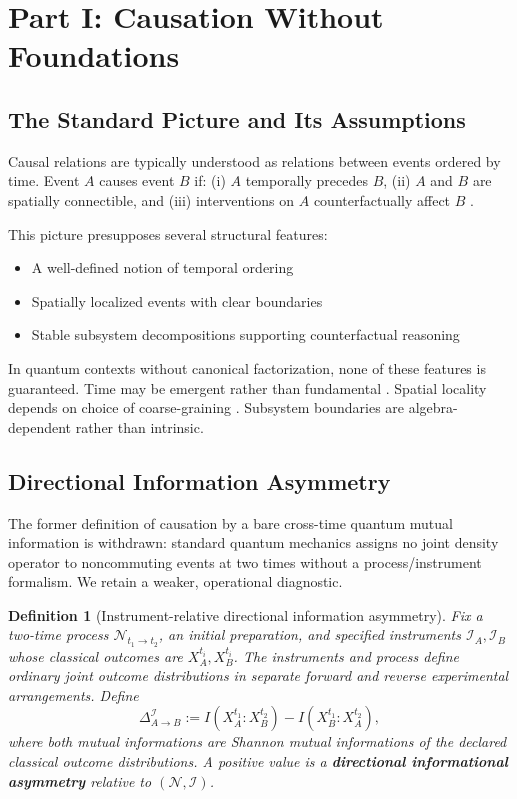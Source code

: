 \documentclass[11pt,a4paper]{article}
\newtheorem{definition}{Definition}[section]
\begin{document}
\section{Part I: Causation Without Foundations}
\label{sec:causation}

\subsection{The Standard Picture and Its Assumptions}
\label{sec:I.1}

Causal relations are typically understood as relations between events ordered by time. Event $A$ causes event $B$ if: (i) $A$ temporally precedes $B$, (ii) $A$ and $B$ are spatially connectible, and (iii) interventions on $A$ counterfactually affect $B$ \cite{Pearl2009}.

This picture presupposes several structural features:
\begin{itemize}
\item A well-defined notion of temporal ordering
\item Spatially localized events with clear boundaries
\item Stable subsystem decompositions supporting counterfactual reasoning
\end{itemize}

In quantum contexts without canonical factorization, none of these features is guaranteed. Time may be emergent rather than fundamental \cite{PageWootters1983}. Spatial locality depends on choice of coarse-graining \cite{Liu2026PaperA}. Subsystem boundaries are algebra-dependent rather than intrinsic.

\subsection{Directional Information Asymmetry}
\label{sec:I.2}

The former definition of causation by a bare cross-time quantum mutual information is withdrawn: standard quantum mechanics assigns no joint density operator to noncommuting events at two times without a process/instrument formalism.  We retain a weaker, operational diagnostic.

\begin{definition}[Instrument-relative directional information asymmetry]
\label{def:causal-asymmetry}
Fix a two-time process $\mathcal N_{t_1\to t_2}$, an initial preparation, and specified instruments $\mathcal I_A,\mathcal I_B$ whose classical outcomes are $X_A^{t_i},X_B^{t_i}$.  The instruments and process define ordinary joint outcome distributions in separate forward and reverse experimental arrangements.  Define
\begin{equation}
\Delta_{A\to B}^{\mathcal I}
:=I\!\left(X_A^{t_1}:X_B^{t_2}\right)
-I\!\left(X_B^{t_1}:X_A^{t_2}\right),
\end{equation}
where both mutual informations are Shannon mutual informations of the declared classical outcome distributions.  A positive value is a \textbf{directional informational asymmetry} relative to $(\mathcal N,\mathcal I)$.
\end{definition}
\end{document}
